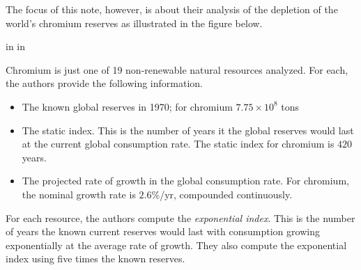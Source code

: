\documentclass{ximera}
\newcommand{\pskip}{\vskip 0.1 in}
\begin{document}
\begin{onlineOnly}
    \begin{center}
\end{center}
\end{onlineOnly}


The focus of this note, however, is about their analysis of the depletion of the world's chromium reserves as illustrated in the figure below. %


 
\begin{onlineOnly}
    \begin{center}
\end{center}
\end{onlineOnly}

\pskip \pskip

Chromium is just one of 19 non-renewable natural resources analyzed. For each, the authors provide the following information.

\begin{itemize}
\item{The known global reserves in 1970; for chromium $7.75\times 10^8$ tons}

\item{The static index. This is the number of years it the global reserves would last at the current global consumption rate. The static index for chromium is $420$ years.}

\item{The projected rate of growth in the global consumption rate. For chromium, the nominal growth rate is $2.6\%$/yr, compounded continuously.}

\end{itemize}

For each resource, the authors compute the \emph{exponential index}. This is the number of years the known current reserves would last with consumption growing exponentially at the average rate of growth. They also compute the exponential index using five times the known reserves. 
\end{document}
